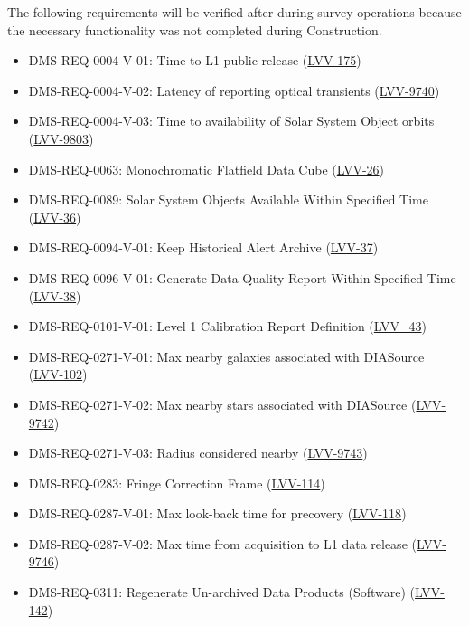 The following requirements will be verified after during survey operations because the necessary functionality was not completed during Construction.

\begin{itemize}
\item DMS-REQ-0004-V-01: Time to L1 public release (\href{https://rubinobs.atlassian.net/browse/LVV-175}{LVV-175})
\item DMS-REQ-0004-V-02: Latency of reporting optical transients (\href{https://rubinobs.atlassian.net/browse/LVV-9740}{LVV-9740})
\item DMS-REQ-0004-V-03: Time to availability of Solar System Object orbits (\href{https://rubinobs.atlassian.net/browse/LVV-9803}{LVV-9803})
\item DMS-REQ-0063: Monochromatic Flatfield Data Cube (\href{https://rubinobs.atlassian.net/browse/LVV-26}{LVV-26})
\item DMS-REQ-0089: Solar System Objects Available Within Specified Time (\href{https://rubinobs.atlassian.net/browse/LVV-36}{LVV-36})
\item DMS-REQ-0094-V-01: Keep Historical Alert Archive (\href{https://rubinobs.atlassian.net/browse/LVV-37}{LVV-37})
\item DMS-REQ-0096-V-01: Generate Data Quality Report Within Specified Time (\href{https://rubinobs.atlassian.net/browse/LVV-38}{LVV-38})
\item DMS-REQ-0101-V-01: Level 1 Calibration Report Definition (\href{https://rubinobs.atlassian.net/browse/LVV-43}{LVV_43})
\item DMS-REQ-0271-V-01: Max nearby galaxies associated with DIASource (\href{https://rubinobs.atlassian.net/browse/LVV-102}{LVV-102})
\item DMS-REQ-0271-V-02: Max nearby stars associated with DIASource (\href{https://rubinobs.atlassian.net/browse/LVV-9742}{LVV-9742})
\item DMS-REQ-0271-V-03: Radius considered nearby (\href{https://rubinobs.atlassian.net/browse/LVV-9743}{LVV-9743})
\item DMS-REQ-0283: Fringe Correction Frame (\href{https://rubinobs.atlassian.net/browse/LVV-114}{LVV-114})
\item DMS-REQ-0287-V-01: Max look-back time for precovery (\href{https://rubinobs.atlassian.net/browse/LVV-118}{LVV-118})
\item DMS-REQ-0287-V-02: Max time from acquisition to L1 data release (\href{https://rubinobs.atlassian.net/browse/LVV-9746}{LVV-9746})
\item DMS-REQ-0311: Regenerate Un-archived Data Products (Software) (\href{https://rubinobs.atlassian.net/browse/LVV-142}{LVV-142})

\end{itemize}
